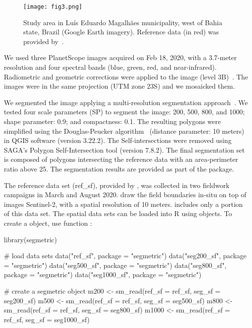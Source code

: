 \begin{figure}[htbp]
  \centering
  \texttt{[image: fig3.png]}
  \caption{Study area in Luís Eduardo Magalhães municipality, west of Bahia state, Brazil (Google Earth imagery). Reference data (in red) was provided by~\citet{Oldoni2020}.}
  \label{fig:studyarea}
\end{figure}

We used three PlanetScope images acquired on Feb 18, 2020, with a 3.7-meter resolution and four spectral bands (blue, green, red, and near-infrared). Radiometric and geometric corrections were applied to the image (level 3B)~\citep{Planet2017}. The images were in the same projection (UTM zone 23S) and we mosaicked them.

We segmented the image applying a multi-resolution segmentation approach~\citep{Baatz2000}. We tested four scale parameters (SP) to segment the image: 200, 500, 800, and 1000; shape parameter: 0.9;  and compactness: 0.1. The resulting polygons were simplified using the Douglas-Peucker algorithm~\citep{Douglas1973} (distance parameter: 10 meters) in QGIS software (version 3.22.2). The Self-intersections were removed using SAGA's Polygon Self-Intersection tool (version 7.8.2). The final segmentation set is composed of polygons intersecting the reference data with an area-perimeter ratio above 25. 
The segmentation results are provided as part of the  package.

The reference data set (ref\_sf), provided by \citet{Oldoni2020}, was collected in two fieldwork campaigns in March and August 2020. \citet{Oldoni2020} draw the field boundaries in-situ on top of images Sentinel-2, with a spatial resolution of 10 meters.  includes only a portion of this data set. The spatial data sets can be loaded into R using  objects. To create a  object, use function :

\begin{example}
library(segmetric)

# load data sets
data("ref_sf", package = "segmetric")
data("seg200_sf", package = "segmetric")
data("seg500_sf", package = "segmetric")
data("seg800_sf", package = "segmetric")
data("seg1000_sf", package = "segmetric")

# create a segmetric object
m200 <- sm_read(ref_sf = ref_sf, seg_sf = seg200_sf)
m500 <- sm_read(ref_sf = ref_sf, seg_sf = seg500_sf)
m800 <- sm_read(ref_sf = ref_sf, seg_sf = seg800_sf)
m1000 <- sm_read(ref_sf = ref_sf, seg_sf = seg1000_sf)
\end{example}

